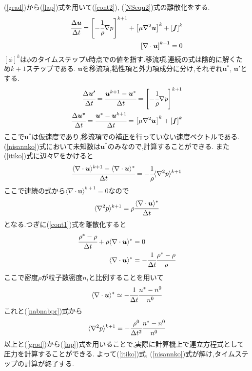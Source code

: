 \documentclass[uplatex,a4j,11pt]{jsarticle}
\begin{document}
(\ref{grad})から(\ref{lap})式を用いて(\ref{cont2}), (\ref{NSequ2})式の離散化をする.
\begin{align}
    \cfrac{\Delta \bm{u}}{\Delta t}=\left[-\cfrac{1}{\rho}\nabla p\right]^{k+1}+\left[\mu\nabla^2\bm{u}\right]^k+\left[\bm{f}\right]^k\\
    \left[\nabla\cdot\bm{u}\right]^{k+1}=0
\end{align}
$[\phi]^k$は$\phi$のタイムステップ$k$時点での値を指す.移流項,連続の式は陰的に解くため$k+1$ステップである.
$\bm{u}$を移流項,粘性項と外力項成分に分け,それぞれ$\bm{u}^*$, $\bm{u}'$とする.
\begin{align}
    \label{itiko}
    \cfrac{\Delta \bm{u'}}{\Delta t}=\cfrac{\bm{u}^{k+1}-\bm{u}^*}{\Delta t}=\left[-\cfrac{1}{\rho}\nabla p\right]^{k+1}\\
    \label{nisannko}
    \cfrac{\Delta \bm{u^*}}{\Delta t}=\cfrac{\bm{u}^*-\bm{u}^{k+1}}{\Delta t}=\left[\mu\nabla^2\bm{u}\right]^k+\left[\bm{f}\right]^k
\end{align}
ここで$\bm{u}^*$は仮速度であり,移流項での補正を行っていない速度ベクトルである.
(\ref{nisannko})式において未知数は$\bm{u}^*$のみなので,計算することができる.
また(\ref{itiko})式に辺々$\nabla$をかけると
\begin{align}
    \cfrac{\langle\nabla\cdot\bm{u}\rangle^{k+1}-\langle\nabla\cdot\bm{u}\rangle^{*}}{\Delta t}=-\cfrac{1}{\rho}\langle\nabla^2p\rangle^{k+1}
\end{align}
ここで連続の式から$\langle\nabla\cdot\bm{u}\rangle^{k+1}=0$なので
\begin{align}
    \label{nabnabpr}
    \langle\nabla^2p\rangle^{k+1}=\rho\cfrac{\langle\nabla\cdot\bm{u}\rangle^{*}}{\Delta t}
\end{align}
となる.つぎに(\ref{cont1})式を離散化すると
\begin{align}
    \cfrac{\rho^*-\rho}{\Delta t}+\rho\langle\nabla\cdot\bm{u}\rangle^*&=0\\
    \langle\nabla\cdot\bm{u}\rangle^*&=-\cfrac{1}{\Delta t}\cfrac{\rho^*-\rho}{\rho}
\end{align}
ここで密度$\rho$が粒子数密度$n_i$と比例することを用いて
\begin{align}
    \langle\nabla\cdot\bm{u}\rangle^*\simeq-\cfrac{1}{\Delta t}\cfrac{n^*-n^0}{n^0}
\end{align}
これと(\ref{nabnabpr})式から
\begin{align}
    \label{nabnabpn}
    \langle\nabla^2p\rangle^{k+1}=-\cfrac{\rho^0}{\Delta t^2}\cfrac{n^*-n^0}{n^0}
\end{align}
以上と(\ref{grad})から(\ref{lap})式を用いることで,実際に計算機上で連立方程式として圧力を計算することができる.
よって(\ref{itiko})式, (\ref{nisannko})式が解け,タイムステップの計算が終了する.\cite{ryuusinyuumon}

\end{document}
